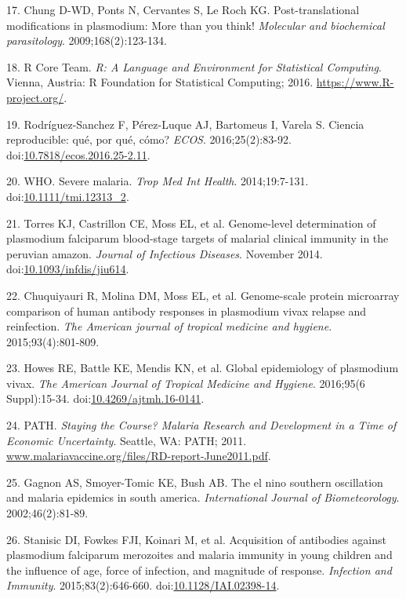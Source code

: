 \documentclass[]{article}
\begin{document}
\hypertarget{ref-leroch2009postmod}{}
17. Chung D-WD, Ponts N, Cervantes S, Le Roch KG. Post-translational
modifications in plasmodium: More than you think! \emph{Molecular and
biochemical parasitology}. 2009;168(2):123-134.

\hypertarget{ref-R}{}
18. R Core Team. \emph{R: A Language and Environment for Statistical
Computing}. Vienna, Austria: R Foundation for Statistical Computing;
2016. \url{https://www.R-project.org/}.

\hypertarget{ref-CienciaReproducible2016}{}
19. Rodríguez-Sanchez F, Pérez-Luque AJ, Bartomeus I, Varela S. Ciencia
reproducible: qué, por qué, cómo? \emph{ECOS}. 2016;25(2):83-92.
doi:\href{https://doi.org/10.7818/ecos.2016.25-2.11}{10.7818/ecos.2016.25-2.11}.

\hypertarget{ref-WHO2014severe}{}
20. WHO. Severe malaria. \emph{Trop Med Int Health}. 2014;19:7-131.
doi:\href{https://doi.org/10.1111/tmi.12313_2}{10.1111/tmi.12313\_2}.

\hypertarget{ref-Torres2014asymptomatic}{}
21. Torres KJ, Castrillon CE, Moss EL, et al. Genome-level determination
of plasmodium falciparum blood-stage targets of malarial clinical
immunity in the peruvian amazon. \emph{Journal of Infectious Diseases}.
November 2014.
doi:\href{https://doi.org/10.1093/infdis/jiu614}{10.1093/infdis/jiu614}.

\hypertarget{ref-chuquiyauri2015vivax}{}
22. Chuquiyauri R, Molina DM, Moss EL, et al. Genome-scale protein
microarray comparison of human antibody responses in plasmodium vivax
relapse and reinfection. \emph{The American journal of tropical medicine
and hygiene}. 2015;93(4):801-809.

\hypertarget{ref-howes2016global}{}
23. Howes RE, Battle KE, Mendis KN, et al. Global epidemiology of
plasmodium vivax. \emph{The American Journal of Tropical Medicine and
Hygiene}. 2016;95(6 Suppl):15-34.
doi:\href{https://doi.org/10.4269/ajtmh.16-0141}{10.4269/ajtmh.16-0141}.

\hypertarget{ref-path2011}{}
24. PATH. \emph{Staying the Course? Malaria Research and Development in
a Time of Economic Uncertainty}. Seattle, WA: PATH; 2011.
\url{www.malariavaccine.org/files/RD-report-June2011.pdf}.

\hypertarget{ref-gagnon2002enso}{}
25. Gagnon AS, Smoyer-Tomic KE, Bush AB. The el nino southern
oscillation and malaria epidemics in south america. \emph{International
Journal of Biometeorology}. 2002;46(2):81-89.

\hypertarget{ref-Stanisic2015}{}
26. Stanisic DI, Fowkes FJI, Koinari M, et al. Acquisition of antibodies
against plasmodium falciparum merozoites and malaria immunity in young
children and the influence of age, force of infection, and magnitude of
response. \emph{Infection and Immunity}. 2015;83(2):646-660.
doi:\href{https://doi.org/10.1128/IAI.02398-14}{10.1128/IAI.02398-14}.
\end{document}
